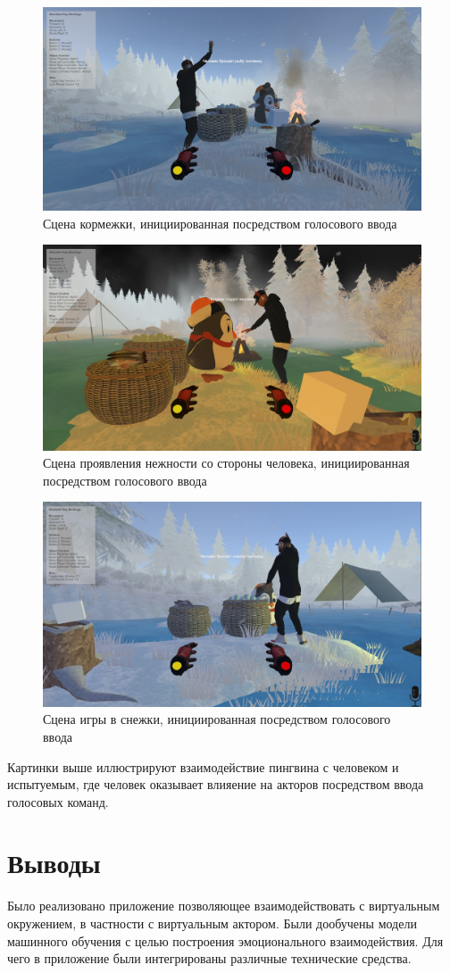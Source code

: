 \begin{figure}[h]
\includegraphics[width=0.75\columnwidth]{./img/peni/kormejka.jpg}
\centering
\caption{Сцена кормежки, инициированная посредством голосового ввода}
\label{pic:kormejka}
\end{figure}

\begin{figure}[h]
\includegraphics[width=0.75\columnwidth]{./img/peni/nejnost.png}
\centering
\caption{Сцена проявления нежности со стороны человека, инициированная посредством голосового ввода}
\label{pic:nejnost}
\end{figure}

\begin{figure}[h]
\includegraphics[width=0.75\columnwidth]{./img/peni/snejok.jpg}
\centering
\caption{Сцена игры в снежки, инициированная посредством голосового ввода}
\label{pic:snejok}
\end{figure}

Картинки выше иллюстрируют взаимодействие пингвина с человеком и испытуемым, 
где человек оказывает влияение на акторов посредством ввода голосовых команд.

\section{Выводы}

Было реализовано приложение позволяющее взаимодействовать с виртуальным окружением, в частности с виртуальным актором. 
Были дообучены модели машинного обучения с целью построения эмоционального взаимодействия. 
Для чего в приложение были интегрированы различные технические средства.
